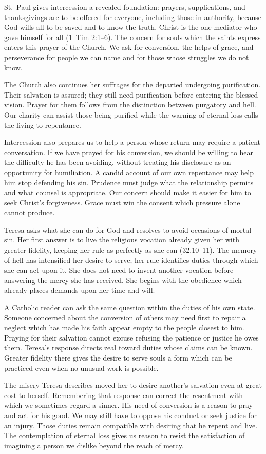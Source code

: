 St.~Paul gives intercession a revealed foundation: prayers, supplications, and thanksgivings are to be offered for everyone, including those in authority, because God wills all to be saved and to know the truth. Christ is the one mediator who gave himself for all (1~Tim 2:1--6). The concern for souls which the saints express enters this prayer of the Church. We ask for conversion, the helps of grace, and perseverance for people we can name and for those whose struggles we do not know.

The Church also continues her suffrages for the departed undergoing purification. Their salvation is assured; they still need purification before entering the blessed vision. Prayer for them follows from the distinction between purgatory and hell. Our charity can assist those being purified while the warning of eternal loss calls the living to repentance.

Intercession also prepares us to help a person whose return may require a patient conversation. If we have prayed for his conversion, we should be willing to hear the difficulty he has been avoiding, without treating his disclosure as an opportunity for humiliation. A candid account of our own repentance may help him stop defending his sin. Prudence must judge what the relationship permits and what counsel is appropriate. Our concern should make it easier for him to seek Christ's forgiveness. Grace must win the consent which pressure alone cannot produce.

Teresa asks what she can do for God and resolves to avoid occasions of mortal sin. Her first answer is to live the religious vocation already given her with greater fidelity, keeping her rule as perfectly as she can (32.10--11). The memory of hell has intensified her desire to serve; her rule identifies duties through which she can act upon it. She does not need to invent another vocation before answering the mercy she has received. She begins with the obedience which already places demands upon her time and will.

A Catholic reader can ask the same question within the duties of his own state. Someone concerned about the conversion of others may need first to repair a neglect which has made his faith appear empty to the people closest to him. Praying for their salvation cannot excuse refusing the patience or justice he owes them. Teresa's response directs zeal toward duties whose claims can be known. Greater fidelity there gives the desire to serve souls a form which can be practiced even when no unusual work is possible.

The misery Teresa describes moved her to desire another's salvation even at great cost to herself. Remembering that response can correct the resentment with which we sometimes regard a sinner. His need of conversion is a reason to pray and act for his good. We may still have to oppose his conduct or seek justice for an injury. Those duties remain compatible with desiring that he repent and live. The contemplation of eternal loss gives us reason to resist the satisfaction of imagining a person we dislike beyond the reach of mercy.

